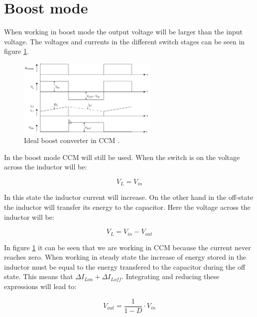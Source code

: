 \section{Boost mode}
When working in boost mode the output voltage will be larger than the input voltage. The voltages and currents in the different switch stages can be seen in figure \ref{CCM_boost}. 

\begin{figure}[H]
	\begin{center}
		\includegraphics[width=0.6\textwidth]{../Pictures/P1/Appendix/boost_currents}
		\caption{Ideal boost converter in CCM \cite{CCM_boost}.}
		\label{CCM_boost}
	\end{center}	
\end{figure}
In the boost mode CCM will still be used. When the switch is on the voltage across the inductor will be:

\begin{equation}
V_L = V_{in}
\end{equation}

In this state the inductor current will increase. On the other hand in the off-state the inductor will transfer its energy to the capacitor. Here the voltage across the inductor will be:

\begin{equation}
V_L = V_{in}-V_{out}
\end{equation}

In figure \ref{CCM_boost} it can be seen that we are working in CCM because the current never reaches zero. 
When working in steady state the increase of energy stored in the inductor must be equal to the energy transfered to the capacitor during the off state. This means that $\Delta I_{Lon}+\Delta I_{Loff}$. Integrating and reducing these expressions will lead to:

\begin{equation}
V_{out} = \frac{1}{1-D}\cdot V_{in}
\end{equation}
 

